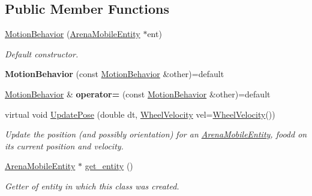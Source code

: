 \subsection*{Public Member Functions}
\begin{DoxyCompactItemize}
\item 
\hyperlink{classMotionBehavior_aa2d5f7d563f4fdb5702edb8367eaa6e7}{Motion\+Behavior} (\hyperlink{classArenaMobileEntity}{Arena\+Mobile\+Entity} $\ast$ent)\hypertarget{classMotionBehavior_aa2d5f7d563f4fdb5702edb8367eaa6e7}{}\label{classMotionBehavior_aa2d5f7d563f4fdb5702edb8367eaa6e7}

\begin{DoxyCompactList}\small\item\em Default constructor. \end{DoxyCompactList}\item 
{\bfseries Motion\+Behavior} (const \hyperlink{classMotionBehavior}{Motion\+Behavior} \&other)=default\hypertarget{classMotionBehavior_a5fe8e8a49e8cb34519a34ca652a23143}{}\label{classMotionBehavior_a5fe8e8a49e8cb34519a34ca652a23143}

\item 
\hyperlink{classMotionBehavior}{Motion\+Behavior} \& {\bfseries operator=} (const \hyperlink{classMotionBehavior}{Motion\+Behavior} \&other)=default\hypertarget{classMotionBehavior_a227057c1862c64bbc609705205473abc}{}\label{classMotionBehavior_a227057c1862c64bbc609705205473abc}

\item 
virtual void \hyperlink{classMotionBehavior_a804f440bb7f03f19abec79a1ab671494}{Update\+Pose} (double dt, \hyperlink{structWheelVelocity}{Wheel\+Velocity} vel=\hyperlink{structWheelVelocity}{Wheel\+Velocity}())
\begin{DoxyCompactList}\small\item\em Update the position (and possibly orientation) for an \hyperlink{classArenaMobileEntity}{Arena\+Mobile\+Entity}, foodd on its current position and velocity. \end{DoxyCompactList}\item 
\hyperlink{classArenaMobileEntity}{Arena\+Mobile\+Entity} $\ast$ \hyperlink{classMotionBehavior_a1daf82b16d312ba6f5f71178e7fafa79}{get\+\_\+entity} ()\hypertarget{classMotionBehavior_a1daf82b16d312ba6f5f71178e7fafa79}{}\label{classMotionBehavior_a1daf82b16d312ba6f5f71178e7fafa79}

\begin{DoxyCompactList}\small\item\em Getter of entity in which this class was created. \end{DoxyCompactList}\end{DoxyCompactItemize}
